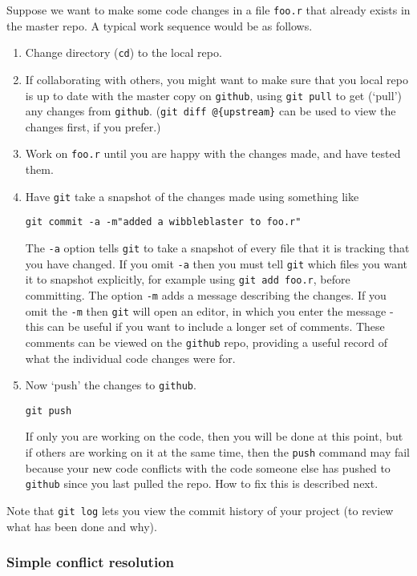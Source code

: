 \documentclass[10pt] {article}
\theoremstyle{definition}
\begin{document}
Suppose we want to make some code changes in a file \lstinline+foo.r+ that already exists in the master repo. A typical work sequence would be as follows.
\begin{enumerate}
\item  Change directory ({\tt cd}) to the local repo. 
\item If collaborating with others, you might want to make sure that you local repo is up to date with the master copy on {\tt github}, using \lstinline+git pull+ to get (`pull') any changes from {\tt github}. (\lstinline+git diff @{upstream}+ can be used to view the changes first, if you prefer.) 
\item Work on {\tt foo.r} until you are happy with the changes made, and have tested them. 
\item Have {\tt git} take a snapshot of the changes made using something like 
\begin{lstlisting}
git commit -a -m"added a wibbleblaster to foo.r"
\end{lstlisting}  
The \lstinline+-a+ option tells {\tt git} to take a snapshot of every file that it is tracking that you have changed. If you omit \lstinline+-a+ then you must tell {\tt git} which files you want it to snapshot explicitly, for example using \lstinline+git add foo.r+, before committing. The option \lstinline+-m+ adds a message describing the changes. If you omit the \lstinline"-m" then {\tt git} will open an editor, in which you enter the message - this can be useful if you want to include a longer set of comments. These comments can be viewed on the {\tt github} repo, providing a useful record of what the individual code changes were for.  
\item Now `push' the changes to {\tt github}. 
\begin{lstlisting}
git push
\end{lstlisting}
If only you are working on the code, then you will be done at this point, but if others are working on it at the same time, then the {\tt push} command may fail because your new code conflicts with the code someone else has pushed to {\tt github} since you last pulled the repo. How to fix this is described next. 
\end{enumerate} 

Note that \lstinline+git log+ lets you view the commit history of your project (to review what has been done and why).

\subsubsection{Simple conflict resolution}
\end{document}
